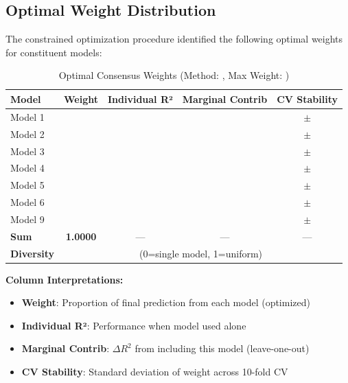 \subsection{Optimal Weight Distribution}

The constrained optimization procedure identified the following optimal weights for constituent models:

\begin{table}[ht]
\centering
\caption{Optimal Consensus Weights (Method: \ModelElevenMethod{}, Max Weight: \ModelElevenMaxWeight{})}
\label{tab:model11_weights}
\begin{tabular}{lcccc}
\toprule
\textbf{Model} & \textbf{Weight} & \textbf{Individual R²} & \textbf{Marginal Contrib} & \textbf{CV Stability} \\
\midrule
Model 1 & \ModelElevenWeightOne{} & \ModelElevenIndivRSquaredOne{} & \ModelElevenContribOne{} & $\pm$\ModelElevenWeightStdOne{} \\
Model 2 & \ModelElevenWeightTwo{} & \ModelElevenIndivRSquaredTwo{} & \ModelElevenContribTwo{} & $\pm$\ModelElevenWeightStdTwo{} \\
Model 3 & \ModelElevenWeightThree{} & \ModelElevenIndivRSquaredThree{} & \ModelElevenContribThree{} & $\pm$\ModelElevenWeightStdThree{} \\
Model 4 & \ModelElevenWeightFour{} & \ModelElevenIndivRSquaredFour{} & \ModelElevenContribFour{} & $\pm$\ModelElevenWeightStdFour{} \\
Model 5 & \ModelElevenWeightFive{} & \ModelElevenIndivRSquaredFive{} & \ModelElevenContribFive{} & $\pm$\ModelElevenWeightStdFive{} \\
Model 6 & \ModelElevenWeightSix{} & \ModelElevenIndivRSquaredSix{} & \ModelElevenContribSix{} & $\pm$\ModelElevenWeightStdSix{} \\
Model 9 & \ModelElevenWeightNine{} & \ModelElevenIndivRSquaredNine{} & \ModelElevenContribNine{} & $\pm$\ModelElevenWeightStdNine{} \\
\midrule
\textbf{Sum} & \textbf{1.0000} & --- & --- & --- \\
\midrule
\textbf{Diversity} & \multicolumn{4}{c}{\ModelElevenDiversityScore{} (0=single model, 1=uniform)} \\
\bottomrule
\end{tabular}
\end{table}

\textbf{Column Interpretations:}
\begin{itemize}
    \item \textbf{Weight}: Proportion of final prediction from each model (optimized)
    \item \textbf{Individual R²}: Performance when model used alone
    \item \textbf{Marginal Contrib}: $\Delta R^2$ from including this model (leave-one-out)
    \item \textbf{CV Stability}: Standard deviation of weight across 10-fold CV
\end{itemize}

